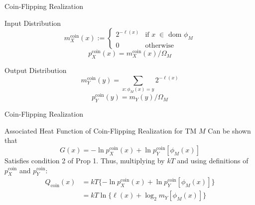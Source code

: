 
\begin{frame}{Coin-Flipping Realization}
    \begin{block}{Input Distribution}
     \begin{equation*}
        m_X^\text{coin}(x) := \begin{cases} 2^{-\ell(x)} &\text{if $x\;\in$ dom $\phi_M$}\\ 0 &\text{otherwise}\end{cases}
    \end{equation*}
    \begin{equation*}
        p_X^\text{coin}(x) = m_X^\text{coin}(x)/\Omega_M
    \end{equation*}
    \end{block}
    \begin{block}{Output Distribution}
    \begin{equation*}
        m_Y^\text{coin}(y) = \sum_{x:\phi_M(x) = y} 2^{-\ell(x)}
    \end{equation*}
    \begin{equation*}
        p_Y^\text{coin}(y) = m_Y(y) / \Omega_M
    \end{equation*}
    \end{block}
\end{frame}

\begin{frame}{Coin-Flipping Realization}
\begin{block}{Associated Heat Function of Coin-Flipping Realization for TM $M$}
Can be shown that 
\begin{equation*}
    G(x) = -\ln p_X^\text{coin}(x) + \ln p_Y^\text{coin}[\phi_M(x)]
\end{equation*}
Satisfies  condition 2 of Prop 1. Thus, multiplying by $kT$ and using definitions of $p_X^\text{coin}$ and $p_Y^\text{coin}$:
\begin{align*}
    Q_\text{coin}(x) &= kT\{-\ln p_X^\text{coin} (x)+ \ln p_Y^\text{coin}[\phi_M(x)]\}\\
    &= kT\ln \{\ell(x) + \log_2 m_Y[\phi_M(x)]\}
\end{align*}
\end{block}
\end{frame}


